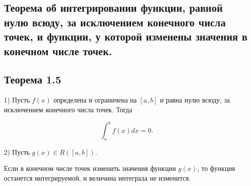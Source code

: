 {
\subsection{Теорема об интегрировании функции, равной нулю всюду, за исключением конечного числа точек, и функции, у которой изменены значения в конечном числе точек.}

\subsection*{Теорема 1.5}

1) Пусть \( f(x) \) определена и ограничена на \( [a, b] \) и равна нулю всюду, за исключением конечного числа точек. Тогда


\[
\int_{a}^{b} f(x) dx = 0.
\]



2) Пусть \( g(x) \in R([a, b]) \).

Если в конечном числе точек изменить значения функции \( g(x) \), то функция останется интегрируемой, и величина интеграла не изменится.

}